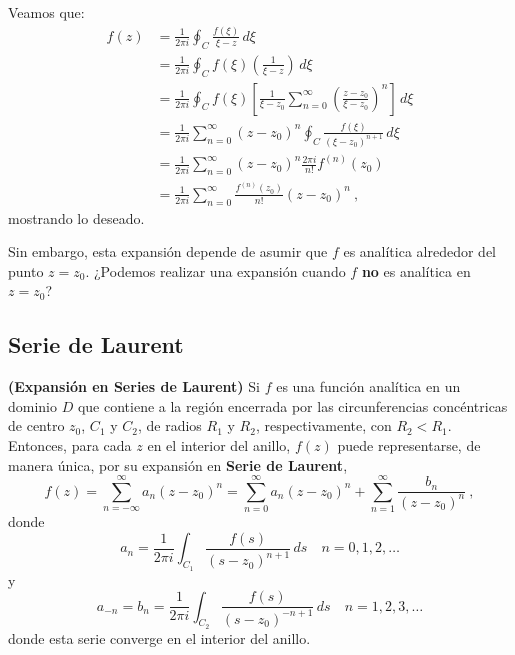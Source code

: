 \begin{demo}
    Veamos que:
    \begin{align*}
        f(z) & = \frac{1}{2\pi i} \oint_C \frac{f(\xi)}{\xi - z} \, d\xi \\
        & = \frac{1}{2\pi i} \oint_C f(\xi) \left(\frac{1}{\xi - z}\right) \, d\xi \\
        & = \frac{1}{2\pi i} \oint_C f(\xi) \left[ \frac{1}{\xi - z_0} \sum_{n=0}^\infty \left(\frac{z-z_0}{\xi-z_0}\right)^n  \right] \, d\xi \\
        & = \frac{1}{2\pi i} \sum_{n=0}^\infty (z-z_0)^n \oint_C \frac{f(\xi)}{(\xi-z_0)^{n+1}} \, d\xi \\
        & = \frac{1}{2\pi i} \sum_{n=0}^\infty (z-z_0)^n \frac{2\pi i}{n!} f^{(n)}(z_0) \\
        & = \frac{1}{2\pi i} \sum_{n=0}^\infty \frac{f^{(n)}(z_0)}{n!} (z-z_0)^n \ ,
    \end{align*}
    mostrando lo deseado.
\end{demo}

Sin embargo, esta expansión depende de asumir que $f$ es analítica alrededor del punto $z=z_0$. ¿Podemos realizar una expansión cuando $f$ \textbf{no} es analítica en $z=z_0$?

\subsection{Serie de Laurent}

\begin{teorema}{\textbf{(Expansión en Series de Laurent)}}
    Si $f$ es una función analítica en un dominio $D$ que contiene a la región encerrada por las circunferencias concéntricas de centro $z_0$, $C_1$ y $C_2$, de radios $R_1$ y $R_2$, respectivamente, con $R_2 < R_1$. Entonces, para cada $z$ en el interior del anillo, $f(z)$ puede representarse, de manera única, por su expansión en \textbf{Serie de Laurent},  
    \begin{equation}
        f(z) = \sum_{n=-\infty}^\infty a_n (z-z_0)^n = \sum_{n=0}^\infty a_n (z-z_0)^n + \sum_{n=1}^\infty \frac{b_n}{(z-z_0)^n} \ , 
    \end{equation}
    donde 
    \begin{equation}
        a_{n} = \frac{1}{2\pi i} \int_{C_1} \frac{f(s)}{(s-z_0)^{n+1}} \, ds \quad n = 0, 1, 2, \dots
    \end{equation}
    y 
    \begin{equation}
        a_{-n} = b_n = \frac{1}{2\pi i} \int_{C_2} \frac{f(s)}{(s-z_0)^{-n+1}} \, ds \quad n = 1, 2, 3, \dots
    \end{equation}
    donde esta serie converge en el interior del anillo.
\end{teorema}

